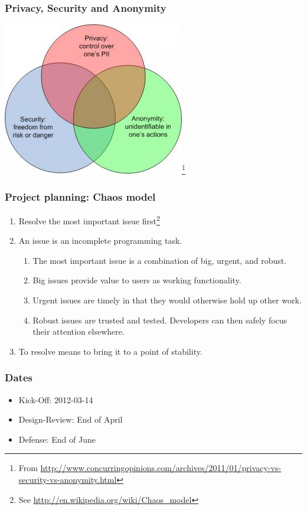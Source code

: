 \documentclass{beamer}
\begin{document}
\frame
{
  \frametitle{Privacy, Security and Anonymity}
    \begin{center}
    \includegraphics[scale=0.5]{privacy-security-anon1-300x253.jpg}\footnote{From \url{http://www.concurringopinions.com/archives/2011/01/privacy-vs-security-vs-anonymity.html}}
    \end{center}
}

\frame
{
  \frametitle{Project planning: Chaos model}
  \begin{enumerate}
     \item Resolve the most important issue first\footnote{See \url{http://en.wikipedia.org/wiki/Chaos_model}}
     \item An issue is an incomplete programming task.
      \begin{enumerate}
         \item The most important issue is a combination of big, urgent, and robust.
         \item Big issues provide value to users as working functionality.
         \item Urgent issues are timely in that they would otherwise hold up other work.
         \item Robust issues are trusted and tested. Developers can then safely focus their attention elsewhere.
      \end{enumerate}
     \item To resolve means to bring it to a point of stability.
  \end{enumerate}
}

\frame
{
  \frametitle{Dates}
  \begin{itemize}
     \item Kick-Off: 2012-03-14
     \item Design-Review: End of April
     \item Defense: End of June
  \end{itemize}
}
\end{document}
